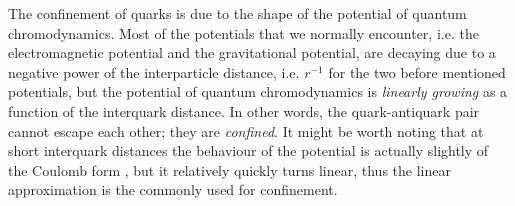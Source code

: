 \documentclass[../main.tex]{subfiles} %
\begin{document}
The confinement of quarks is due to the shape of the potential of quantum chromodynamics. Most of the potentials that we normally encounter, i.e. the electromagnetic potential and the gravitational potential, are decaying due to a negative power of the interparticle distance, i.e. $r^{-1}$ for the two before mentioned potentials, but the potential of quantum chromodynamics is \emph{linearly growing} as a function of the interquark distance. In other words, the quark-antiquark pair cannot escape each other; they are \emph{confined}. It might be worth noting that at short interquark distances the behaviour of the potential is actually slightly of the Coulomb form \cite{petkovic_stringBreakingAndQuarkConfinement_2018}, but it relatively quickly turns linear, thus the linear approximation is the commonly used for confinement.
\end{document}
